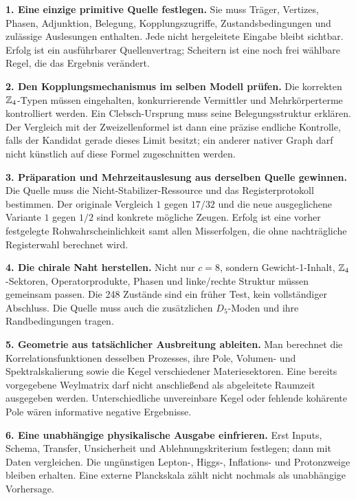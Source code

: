 \textbf{1. Eine einzige primitive Quelle festlegen.} Sie muss Träger, Vertizes, Phasen, Adjunktion, Belegung, Kopplungszugriffe, Zustandsbedingungen und zulässige Auslesungen enthalten. Jede nicht hergeleitete Eingabe bleibt sichtbar. Erfolg ist ein ausführbarer Quellenvertrag; Scheitern ist eine noch frei wählbare Regel, die das Ergebnis verändert.

\textbf{2. Den Kopplungsmechanismus im selben Modell prüfen.} Die korrekten $\mathbb Z_4$-Typen müssen eingehalten, konkurrierende Vermittler und Mehrkörperterme kontrolliert werden. Ein Clebsch-Ursprung muss seine Belegungsstruktur erklären. Der Vergleich mit der Zweizellenformel ist dann eine präzise endliche Kontrolle, falls der Kandidat gerade dieses Limit besitzt; ein anderer nativer Graph darf nicht künstlich auf diese Formel zugeschnitten werden.

\textbf{3. Präparation und Mehrzeitauslesung aus derselben Quelle gewinnen.} Die Quelle muss die Nicht-Stabilizer-Ressource und das Registerprotokoll bestimmen. Der originale Vergleich $1$ gegen $17/32$ und die neue ausgeglichene Variante $1$ gegen $1/2$ sind konkrete mögliche Zeugen. Erfolg ist eine vorher festgelegte Rohwahrscheinlichkeit samt allen Misserfolgen, die ohne nachträgliche Registerwahl berechnet wird.

\textbf{4. Die chirale Naht herstellen.} Nicht nur $c=8$, sondern Gewicht-1-Inhalt, $\mathbb Z_4$-Sektoren, Operatorprodukte, Phasen und linke/rechte Struktur müssen gemeinsam passen. Die 248 Zustände sind ein früher Test, kein vollständiger Abschluss. Die Quelle muss auch die zusätzlichen $D_5$-Moden und ihre Randbedingungen tragen.

\textbf{5. Geometrie aus tatsächlicher Ausbreitung ableiten.} Man berechnet die Korrelationsfunktionen desselben Prozesses, ihre Pole, Volumen- und Spektralskalierung sowie die Kegel verschiedener Materiesektoren. Eine bereits vorgegebene Weylmatrix darf nicht anschließend als abgeleitete Raumzeit ausgegeben werden. Unterschiedliche unvereinbare Kegel oder fehlende kohärente Pole wären informative negative Ergebnisse.

\textbf{6. Eine unabhängige physikalische Ausgabe einfrieren.} Erst Inputs, Schema, Transfer, Unsicherheit und Ablehnungskriterium festlegen; dann mit Daten vergleichen. Die ungünstigen Lepton-, Higgs-, Inflations- und Protonzweige bleiben erhalten. Eine externe Planckskala zählt nicht nochmals als unabhängige Vorhersage.

